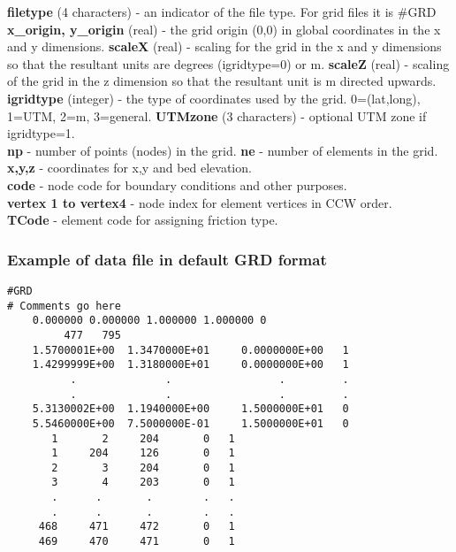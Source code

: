 \documentclass{article}
\begin{document}
\noindent
\textbf{filetype} (4 characters) - an indicator of the file type.  For grid files it is \#GRD \newline
\textbf{x\_origin, y\_origin} (real) - the grid origin (0,0) in global coordinates in the x and y dimensions. \newline
\textbf{scaleX} (real) - scaling for the grid in the x and y dimensions so that the resultant units are degrees (igridtype=0) or m. \newline
\textbf{scaleZ} (real) - scaling of the grid in the z dimension so that the resultant unit is m directed upwards.  \newline
\textbf{igridtype} (integer) - the type of coordinates used by the grid. 0=(lat,long), 1=UTM, 2=m, 3=general. \newline
\textbf{UTMzone} (3 characters) - optional UTM zone if igridtype=1. \\
\textbf{np} - number of points (nodes) in the grid.\newline
\textbf{ne} - number of elements in the grid.\newline
\textbf{x,y,z} - coordinates for x,y and bed elevation. \\
\textbf{code} - node code for boundary conditions and other purposes. \\
\textbf{vertex 1 to vertex4} - node index for element vertices in CCW order. \\
\textbf{TCode} - element code for assigning friction type.  \\

\subsubsection{Example of data file in default GRD format}

\begin{small}
\begin{lstlisting}
#GRD
# Comments go here
    0.000000 0.000000 1.000000 1.000000 0 
         477   795
    1.5700001E+00  1.3470000E+01     0.0000000E+00   1  
    1.4299999E+00  1.3180000E+01     0.0000000E+00   1  
          .              .                 .         .
          .              .                 .         .
    5.3130002E+00  1.1940000E+00     1.5000000E+01   0  
    5.5460000E+00  7.5000000E-01     1.5000000E+01   0  
       1       2     204       0   1
       1     204     126       0   1
       2       3     204       0   1
       3       4     203       0   1
       .      .       .        .   .
       .      .       .        .   .
     468     471     472       0   1
     469     470     471       0   1
\end{lstlisting}
\end{small}
\end{document}
